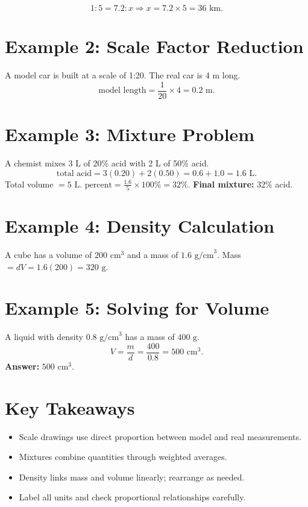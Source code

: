 \documentclass[12pt]{article}
\begin{document}
\[
1:5 = 7.2:x \Rightarrow x = 7.2 \times 5 = \boxed{36\text{ km}}.
\]

\section*{Example 2: Scale Factor Reduction}

A model car is built at a scale of 1:20. The real car is 4 m long.  
\[
\text{model length} = \frac{1}{20}\times 4 = \boxed{0.2\text{ m}}.
\]

\section*{Example 3: Mixture Problem}

A chemist mixes 3 L of 20\% acid with 2 L of 50\% acid.  
\[
\text{total acid} = 3(0.20)+2(0.50)=0.6+1.0=1.6\text{ L}.
\]
Total volume \(=5\text{ L}\).  
\(\text{percent}=\frac{1.6}{5}\times100\%=32\%\).  
\textbf{Final mixture:} 32\% acid.

\section*{Example 4: Density Calculation}

A cube has a volume of \(200\text{ cm}^3\) and a mass of \(1.6\text{ g/cm}^3\).  
Mass \(=dV=1.6(200)=\boxed{320\text{ g}}\).

\section*{Example 5: Solving for Volume}

A liquid with density \(0.8\text{ g/cm}^3\) has a mass of \(400\text{ g}\).  
\[
V=\frac{m}{d}=\frac{400}{0.8}=500\text{ cm}^3.
\]
\textbf{Answer:} \(\boxed{500\text{ cm}^3}\).

\section*{Key Takeaways}
\begin{itemize}
  \item Scale drawings use direct proportion between model and real measurements.
  \item Mixtures combine quantities through weighted averages.
  \item Density links mass and volume linearly; rearrange as needed.
  \item Label all units and check proportional relationships carefully.
\end{itemize}
\end{document}

